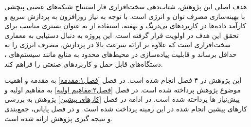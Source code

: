 هدف اصلی این پژوهش، شتاب‌دهی سخت‌افزاری فاز استنتاج شبکه‌های عصبی پیچشی با بهینه‌سازی مصرف توان و انرژی است. با توجه به نیاز روزافزون به پردازش سریع و کارآمد داده‌ها در کاربردهای بی‌درنگ و نهفته، استفاده از  به عنوان بستری مناسب برای تحقق این هدف در اولویت قرار گرفته است. این پروژه به دنبال دستیابی به معماری سخت‌افزاری است که علاوه بر ارائه سرعت بالا در پردازش، مصرف انرژی را به حداقل برساند و قابلیت پیاده‌سازی در محیط‌های محدود به منابع مانند سیستم‌های ، دستگاه‌های قابل حمل و کاربردهای صنعتی را فراهم کند.

	
این پژوهش در ۴ فصل انجام شده است. در فصل \ref{فصل۱:مقدمه} به مقدمه و اهمیت موضوع پژوهش پرداخته شده است. در فصل \ref{فصل۲:مفاهیم اولیه} به مفاهیم اولیه و پیش‌نیاز ها پرداخته شده است. در ادامه در فصل \ref{کار‌های پیشین} پژوهش به بررسی کار‌های پیشین انجام شده در این زمینه پرداخت شده است. و در فصل پایانی، جمع‌بندی و نتیجه گیری پژوهش ارائه شده است.